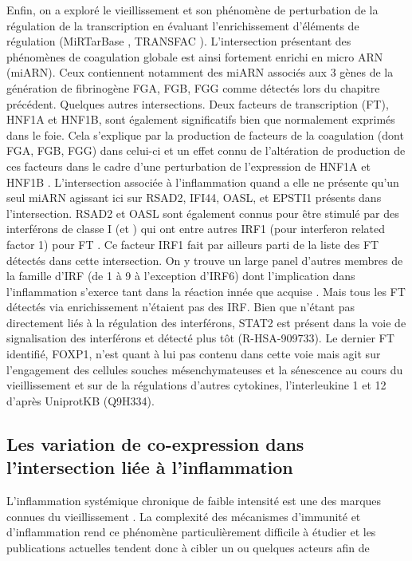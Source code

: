 Enfin, on a exploré le vieillissement et son phénomène de perturbation de la régulation de la transcription en évaluant l'enrichissement d'éléments de régulation (MiRTarBase \cite{Chou2018}, TRANSFAC \cite{Matys2006}). L'intersection présentant des phénomènes de coagulation globale est ainsi fortement enrichi en micro ARN (miARN). Ceux contiennent notamment des miARN associés aux 3 gènes de la génération de fibrinogène FGA, FGB, FGG comme détectés lors du chapitre précédent. Quelques autres intersections. Deux facteurs de transcription (FT), HNF1A et HNF1B, sont également significatifs bien que normalement exprimés dans le foie. Cela s'explique par la production de facteurs de la coagulation (dont FGA, FGB, FGG) dans celui-ci et un effet connu de l'altération de production de ces facteurs dans le cadre d'une perturbation de l'expression de HNF1A et HNF1B \cite{Costa2003}. L'intersection associée à l'inflammation quand a elle ne présente qu'un seul miARN agissant ici sur RSAD2, IFI44, OASL, et EPSTI1 présents dans l'intersection. RSAD2 et OASL sont également connus pour être stimulé par des interférons de classe I (\textalpha et \textbeta) qui ont entre autres IRF1 (pour interferon related factor 1) pour FT \cite{Schoggins2011}. Ce facteur IRF1 fait par ailleurs parti de la liste des FT détectés dans cette intersection. On y trouve un large panel d'autres membres de la famille d'IRF (de 1 à 9 à l'exception d'IRF6) dont l'implication dans l'inflammation s'exerce tant dans la réaction innée que acquise \cite{Frisch2020}. Mais tous les FT détectés via enrichissement n'étaient pas des IRF. Bien que n'étant pas directement liés à la régulation des interférons, STAT2 est présent dans la voie de signalisation des interférons \textalpha et \textbeta détecté plus tôt (R-HSA-909733). Le dernier FT identifié, FOXP1, n'est quant à lui pas contenu dans cette voie mais agit sur l'engagement des cellules souches mésenchymateuses et la sénescence au cours du vieillissement \cite{Infante2018} et sur de la régulations d'autres cytokines, l'interleukine 1 et 12 d'après UniprotKB (Q9H334).

\subsection{Les variation de co-expression dans l'intersection liée à l'inflammation}

L'inflammation systémique chronique de faible intensité est une des marques connues du vieillissement \cite{Lopez-Otin2013, Franchini2006}. La complexité des mécanismes d'immunité et d'inflammation rend ce phénomène particulièrement difficile à étudier et les publications actuelles tendent donc à cibler un ou quelques acteurs afin de 

